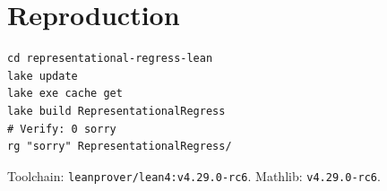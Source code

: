 \documentclass[11pt]{article}
\begin{document}
\section{Reproduction}
\label{app:repro}


\begin{verbatim}
cd representational-regress-lean
lake update
lake exe cache get
lake build RepresentationalRegress
# Verify: 0 sorry
rg "sorry" RepresentationalRegress/
\end{verbatim}

\noindent
Toolchain: \texttt{leanprover/lean4:v4.29.0-rc6}. Mathlib: \texttt{v4.29.0-rc6}.
\end{document}

